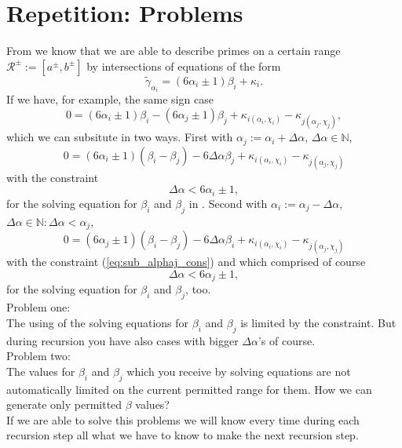 \documentclass{amsart}
\begin{document}
\section{Repetition: Problems}
\label{s:problems}
From \cite{CaZoeb} we know that we are able to describe primes on a certain range $\mathcal{R}^{\pm}:=[a^{\pm},b^{\pm}]$ by intersections of equations of the form
\begin{equation}
	\tilde{\gamma}_{\alpha_{i}}=\left(6\alpha_{i} \pm 1\right)\beta_{i} + \kappa_{i}.
\label{eq:gen}\end{equation}
If we have, for example, the same sign case
\begin{equation}
	0 = \left(6\alpha_{i} \pm 1\right)\beta_{i} - \left(6\alpha_{j} \pm 1\right)\beta_{j} + \kappa_{i\left(\alpha_{i}, \chi_{i}\right)} - \kappa_{j\left(\alpha_{j}, \chi_{j}\right)},
\label{eq:int}\end{equation}
which we can subsitute in two ways. First with $\alpha_{j} := \alpha_{i} + \Delta\alpha$, $\Delta\alpha \in \mathbb{N}$,
\begin{equation}
	0 = \left(6\alpha_{i} \pm 1\right)\left(\beta_{i} - \beta_{j}\right) - 6\Delta\alpha\beta_{j} + \kappa_{i\left(\alpha_{i}, \chi_{i}\right)} - \kappa_{j\left(\alpha_{j}, \chi_{j}\right)}
\label{eq:sub_alphaj}\end{equation}
with the constraint
\begin{equation}
	\Delta\alpha < 6\alpha_{i} \pm 1,
\label{eq:sub_alphaj_cons}\end{equation}
for the solving equation for $\beta_{i}$ and $\beta_{j}$ in \cite{CaZoeb}. Second with $\alpha_{i} := \alpha_{j} - \Delta\alpha$, $\Delta\alpha \in \mathbb{N}:\Delta\alpha < \alpha_{j}$,
\begin{equation}
	0 = \left(6\alpha_{j} \pm 1\right)\left(\beta_{i} - \beta_{j}\right) - 6\Delta\alpha\beta_{i} + \kappa_{i\left(\alpha_{i}, \chi_{i}\right)} - \kappa_{j\left(\alpha_{j}, \chi_{j}\right)}
\label{eq:sub_alphai}\end{equation}
with the constraint (\ref{eq:sub_alphaj_cons}) and which comprised of course 
\begin{equation}
	\Delta\alpha < 6\alpha_{j} \pm 1,
\label{eq:sub_alphai_cons}\end{equation}
for the solving equation for $\beta_{i}$ and $\beta_{j}$, too.\\
Problem one:\\
The using of the solving equations for $\beta_{i}$ and $\beta_{j}$ is limited by the constraint. But during recursion you have also cases with bigger $\Delta\alpha$'s of course.\\
Problem two:\\
The values for $\beta_{i}$ and $\beta_{j}$ which you receive by solving equations are not automatically limited on the current permitted range for them. How we can generate only permitted $\beta$ values?\\
If we are able to solve this problems we will know every time during each recursion step all what we have to know to make the next recursion step.
\end{document}
